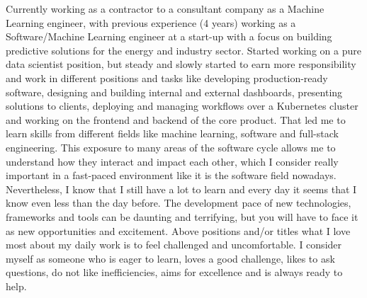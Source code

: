

\begin{cvparagraph}
Currently working as a contractor to a consultant company as a Machine Learning engineer, with previous experience (4 years) working as a Software/Machine Learning engineer at a start-up with a focus on building predictive solutions for the energy and industry sector. Started working on a pure data scientist position, but steady and slowly started to earn more responsibility and work in different positions and tasks like developing production-ready software, designing and building internal and
  external dashboards, presenting solutions to clients, deploying and managing workflows over a Kubernetes cluster and working on the frontend and backend of the core product. That led me to learn skills from different fields like machine learning, software and full-stack engineering. This exposure to many areas of the software cycle allows me to understand how they interact and impact each other, which I consider really important in a fast-paced environment like it is the software field
  nowadays. Nevertheless, I know that I still have a lot to learn and every day it seems that I know even less than the day before. The development pace of new technologies, frameworks and tools can be daunting and terrifying, but you will have to face it as new opportunities and excitement.
 Above positions and/or titles what I love most about my daily work is to feel challenged and uncomfortable. I consider myself as someone who is eager to learn, loves a good challenge, likes to ask questions, do not like inefficiencies, aims for excellence and is always ready to help.
\end{cvparagraph}
